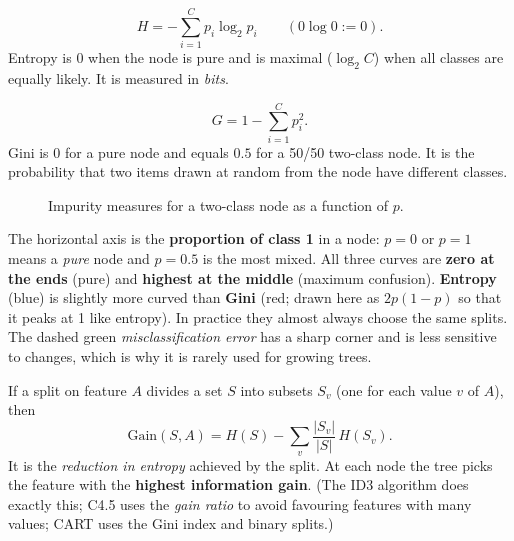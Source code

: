 \begin{definition}[: Entropy]
\[
  H=-\sum_{i=1}^{C}p_i\log_2 p_i\qquad(0\log0:=0).
\]
Entropy is $0$ when the node is pure and is maximal ($\log_2C$) when all classes are equally likely. It is measured in \emph{bits}.
\end{definition}

\begin{definition}
\[
  G=1-\sum_{i=1}^{C}p_i^2 .
\]
Gini is $0$ for a pure node and equals $0.5$ for a 50/50 two-class node. It is the probability that two items drawn at random from the node have different classes.
\end{definition}

\begin{figure}[!htbp]
\centering
{}
\caption{Impurity measures for a two-class node as a function of $p$.}\label{fig:impurity}
\end{figure}

\begin{explain}
The horizontal axis is the \textbf{proportion of class 1} in a node: $p=0$ or $p=1$ means a \emph{pure} node and $p=0.5$ is the most mixed. All three curves are \textbf{zero at the ends} (pure) and \textbf{highest at the middle} (maximum confusion). \textbf{Entropy} (blue) is slightly more curved than \textbf{Gini} (red; drawn here as $2p(1-p)$ so that it peaks at 1 like entropy). In practice they almost always choose the same splits. The dashed green \emph{misclassification error} has a sharp corner and is less sensitive to changes, which is why it is rarely used for growing trees.
\end{explain}

\begin{definition}
If a split on feature $A$ divides a set $S$ into subsets $S_v$ (one for each value $v$ of $A$), then
\[
  \text{Gain}(S,A)=H(S)-\sum_{v}\frac{|S_v|}{|S|}\,H(S_v).
\]
It is the \emph{reduction in entropy} achieved by the split. At each node the tree picks the feature with the \textbf{highest information gain}. (The ID3 algorithm does exactly this; C4.5 uses the \emph{gain ratio} to avoid favouring features with many values; CART uses the Gini index and binary splits.)
\end{definition}


